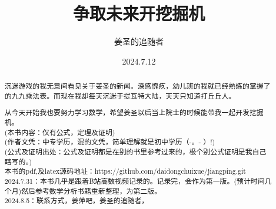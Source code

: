 
\title{争取未来开挖掘机} %
\author{姜圣的追随者}  %
\date{2024.7.12} %

\maketitle %
\newpage
\begin{abstract}
    沉迷游戏的我无意间看见关于姜圣的新闻。深感愧疚，幼儿班的我就已经熟练的掌握了的九九乘法表。而现在我却每天沉迷于提瓦特大陆，天天只知道打丘丘人。\par 从今天开始我也要努力学习数学，希望姜圣以后当上院士的时候能带我一起开发挖掘机。
    \\(本书内容：仅有公式，定理及证明)
    \\(作者文凭：中专学历，混的文凭，简单理解就是初中学历（-。- ）!)
    \\(公式及证明出处：公式及证明都是在别的书里参考过来的，极个别公式证明是我自己瞎写的。)
    \\本书的pdf,及latex源码地址：https://github.com/daidongchuixue/jiangping.git
    \\2024.7.31：本书几乎是跟着B站高数视频记录的。记录完，会作为第一版。(预计时间几个月)然后参考数学分析书籍重新整理，为第二版。
    \\2024.8.5：联系方式，姜萍吧，姜圣的追随者，
\end{abstract}
\newpage
\renewcommand{\contentsname}{目录}
\tableofcontents %


\pagestyle{fancy} %

